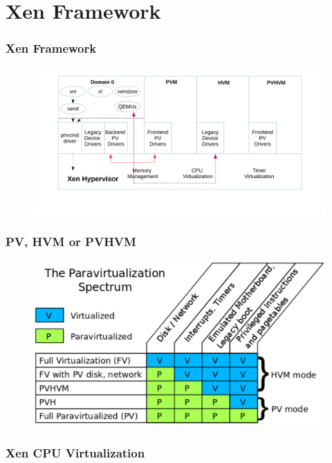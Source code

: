 \documentclass[aspectratio=169]{beamer}
\begin{document}
\section{Xen Framework}
\begin{frame}
\frametitle{Xen Framework}
\begin{figure}
\includegraphics[width=1.0\linewidth]{figures/xen.pdf}
\end{figure}
\end{frame}


\begin{frame}
\frametitle{PV, HVM or PVHVM}
\begin{figure}
\includegraphics[width=0.8\linewidth]{figures/spectrum.pdf}
\end{figure}
\end{frame}


\begin{frame}
\frametitle{Xen CPU Virtualization}
\end{frame}

\end{document}
